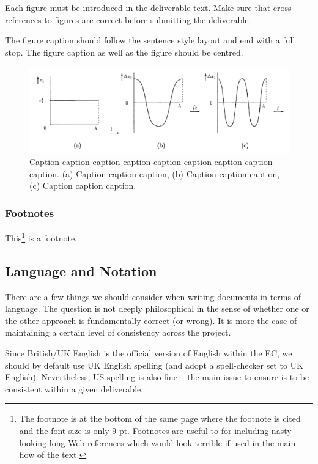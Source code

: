 Each figure must be introduced in the deliverable text. Make sure that cross references to figures are correct before submitting the deliverable.

The figure caption should follow the sentence style layout and end with a full stop. The figure caption as well as the figure should be centred.

\begin{figure}[htb]
	\centering
	\includegraphics[width=.89\linewidth]{graphics/figure}
	\caption{Caption caption caption caption caption caption caption caption caption. (a) Caption caption caption, (b) Caption caption caption, (c) Caption caption caption.}
	\label{fig:figure}
\end{figure}

\subsubsection{Footnotes}
\label{sec:footnotes}

This\footnote{The footnote is at the bottom of the same page where the footnote is cited and the font size is only 9 pt. Footnotes are useful to for including nasty-looking long Web references which would look terrible if used in the main flow of the text.} is a footnote.

\subsection{Language and Notation}
\label{sec:language-and_notation}

There are a few things we should consider when writing documents in terms of language. The question is not deeply philosophical in the sense of whether one or the other approach is fundamentally correct (or wrong). It is more the case of maintaining a certain level of consistency across the project.

Since British/UK English is the official version of English within the \ac{EC}, we should by default use UK English spelling (and adopt a spell-checker set to UK English). Nevertheless, US spelling is also fine – the main issue to ensure is to be consistent within a given deliverable.

